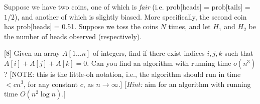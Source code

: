 \documentclass[addpoints]{exam}
\begin{document}
\begin{questions}
Suppose we have two coins, one of which is {\em fair} (i.e. prob[heads] = prob[tails] = $1/2$), and another of which is slightly biased. More specifically, the second coin has prob[heads] = 0.51. Suppose we toss the coins $N$ times, and let $H_1$ and $H_2$ be the number of heads observed (respectively).


[8]
Given an array $A[1 \dots n]$ of integers, find if there exist indices $i, j, k$ such that $A[i]+A[j]+A[k] = 0$.  Can you find an algorithm with running time $o(n^3)$? [NOTE: this is the little-oh notation, i.e., the algorithm should run in time $< cn^3$, for any constant $c$, as $n \rightarrow \infty$.] [{\em Hint:} aim for an algorithm with running time $O(n^2 \log n)$.]

\end{questions}
\end{document}
